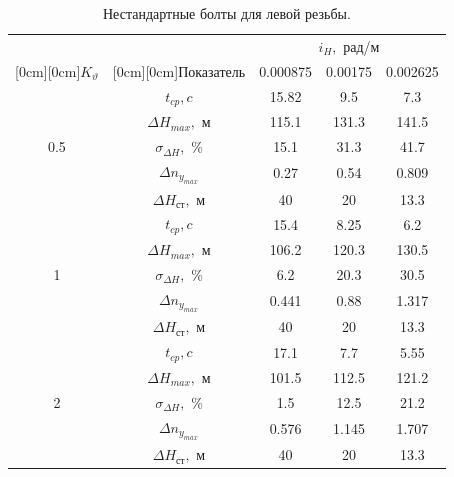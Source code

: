 \documentclass[a4paper,12pt]{article}
\begin{document}
\begin{enumerate}
    
    \begin{table}[H]
        \caption{\label{tab:Результаты расчётов} Нестандартные болты для левой резьбы.}
        \begin{center}
            \begin{tabular}{|c|c|c|c|c|}
            \hline
            & \multicolumn{1}{|c|}{} & \multicolumn{3}{|c|}{$i_H,$ рад/м}  \\
            \cline{3-5}
            \raisebox{1.5ex}[0cm][0cm]{$K_{\vartheta}$} & \raisebox{1.5ex}[0cm][0cm]{Показатель}
            & 0.000875 & 0.00175 &0.002625\\
            \hline
            & $t_{cp}, c$ & 15.82 & 9.5 & 7.3\\ 
            \cline{2-5} 
            & $\Delta H_{max},$ м & 115.1 & 131.3 & 141.5\\ 
            \cline{2-5} 
            0.5& $\sigma_{\Delta H},$ \% & 15.1 & 31.3 & 41.7\\ 
            \cline{2-5} 
            & $\Delta n_{y_{max}}$ & 0.27 & 0.54 & 0.809\\ 
            \cline{2-5} 
            & $\Delta H_{\text{ст}},$ м & 40 & 20 & 13.3\\ 
            \hline
            & $t_{cp}, c$ & 15.4 & 8.25 & 6.2\\
            \cline{2-5} 
            & $\Delta H_{max},$ м & 106.2 & 120.3 & 130.5\\ 
            \cline{2-5} 
            1& $\sigma_{\Delta H},$ \% & 6.2 & 20.3 & 30.5\\ 
            \cline{2-5} 
            & $\Delta n_{y_{max}}$ & 0.441 & 0.88 & 1.317\\ 
            \cline{2-5} 
            & $\Delta H_{\text{ст}},$ м & 40 & 20 & 13.3\\
            \hline
            & $t_{cp}, c$ & 17.1 & 7.7 & 5.55\\
            \cline{2-5} 
            & $\Delta H_{max},$ м & 101.5 & 112.5 & 121.2\\ 
            \cline{2-5} 
            2& $\sigma_{\Delta H},$ \% & 1.5 & 12.5 & 21.2\\ 
            \cline{2-5} 
            & $\Delta n_{y_{max}}$ & 0.576 & 1.145 & 1.707\\ 
            \cline{2-5} 
            & $\Delta H_{\text{ст}},$ м & 40 & 20 & 13.3\\ 
            \hline
            \end{tabular}
        \end{center}
    \end{table}


\end{enumerate}
\end{document}
